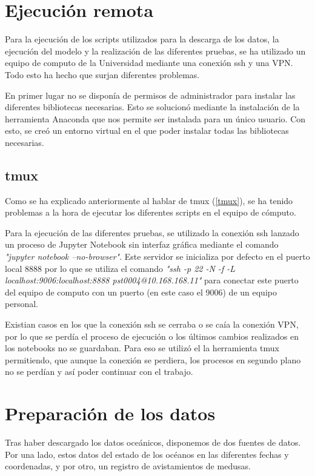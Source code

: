 \section{Ejecución remota}
Para la ejecución de los scripts utilizados para la descarga de los datos, la ejecución del modelo y la realización de las diferentes pruebas, se ha utilizado un equipo de computo de la Universidad mediante una conexión ssh y una VPN. Todo esto ha hecho que surjan diferentes problemas.

En primer lugar no se disponía de permisos de administrador para instalar las diferentes bibliotecas necesarias. Esto se solucionó mediante la instalación de la herramienta Anaconda que nos permite ser instalada para un único usuario. Con esto, se creó un entorno virtual en el que poder instalar todas las bibliotecas necesarias.

\subsection{tmux}
Como se ha explicado anteriormente al hablar de tmux (\ref{tmux}), se ha tenido problemas a la hora de ejecutar los diferentes scripts en el equipo de cómputo.

Para la ejecución de las diferentes pruebas, se utilizado la conexión ssh lanzado un proceso de Jupyter Notebook sin interfaz gráfica mediante el comando \emph{"jupyter notebook --no-browser"}. Este servidor se inicializa por defecto en el puerto local 8888 por lo que se utiliza el comando \emph{"ssh -p 22 -N -f -L localhost:9006:localhost:8888 pst0004@10.168.168.11"} para conectar este puerto del equipo de computo con un puerto (en este caso el 9006) de un equipo personal.

Existian casos en los que la conexión ssh se cerraba o se caía la conexión VPN, por lo que se perdía el proceso de ejecución o los últimos cambios realizados en los notebooks no se guardaban. Para eso se utilizó el la herramienta tmux permitiendo, que aunque la conexión se perdiera, los procesos en 
segundo plano no se perdían y así poder continuar con el trabajo.

\section{Preparación de los datos}
Tras haber descargado los datos oceánicos, disponemos de dos fuentes de datos. Por una lado, estos datos del estado de los océanos en las diferentes fechas y coordenadas, y por otro, un registro de avistamientos de medusas.

